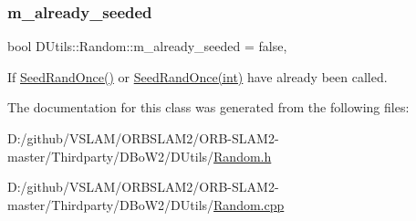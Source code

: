 \subsubsection{\texorpdfstring{m\+\_\+already\+\_\+seeded}{m\_already\_seeded}}
{\footnotesize\ttfamily bool D\+Utils\+::\+Random\+::m\+\_\+already\+\_\+seeded = false\hspace{0.3cm}{\ttfamily [static]}, {\ttfamily [private]}}



If \mbox{\hyperlink{class_d_utils_1_1_random_a168e77d82ce1e66c6759e97ef27adbbc}{Seed\+Rand\+Once()}} or \mbox{\hyperlink{class_d_utils_1_1_random_ad3652f5d105ca4f6f22696b64f2a4a5d}{Seed\+Rand\+Once(int)}} have already been called. 



The documentation for this class was generated from the following files\+:\begin{DoxyCompactItemize}
\item 
D\+:/github/\+V\+S\+L\+A\+M/\+O\+R\+B\+S\+L\+A\+M2/\+O\+R\+B-\/\+S\+L\+A\+M2-\/master/\+Thirdparty/\+D\+Bo\+W2/\+D\+Utils/\mbox{\hyperlink{_random_8h}{Random.\+h}}\item 
D\+:/github/\+V\+S\+L\+A\+M/\+O\+R\+B\+S\+L\+A\+M2/\+O\+R\+B-\/\+S\+L\+A\+M2-\/master/\+Thirdparty/\+D\+Bo\+W2/\+D\+Utils/\mbox{\hyperlink{_random_8cpp}{Random.\+cpp}}\end{DoxyCompactItemize}

